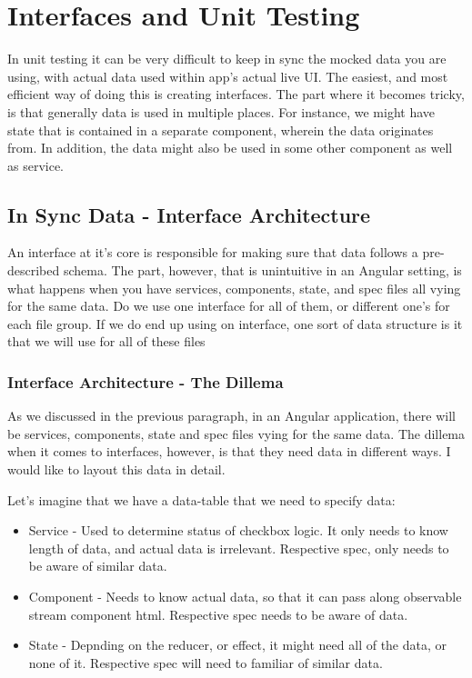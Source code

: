 \maketitle{}
\section{ Interfaces and Unit Testing }
In unit testing it can be very difficult to keep in sync the mocked data you
are using, with actual data used within app's actual live UI. The easiest, and
most efficient way of doing this is creating interfaces. The part where it
becomes tricky, is that generally data is used in multiple places. For instance,
we might have state that is contained in a separate component, wherein the data
originates from. In addition, the data might also be used in some other component
as well as service.

\subsection{ In Sync Data - Interface Architecture }
An interface at it's core is responsible for making sure that data follows a
pre-described schema. The part, however, that is unintuitive in an Angular
setting, is what happens when you have services, components, state, and spec
files all vying for the same data. Do we use one interface for all of them,
or different one's for each file group. If we do end up using on interface, one
sort of data structure is it that we will use for all of these files

\subsubsection{ Interface Architecture - The Dillema }
As we discussed in the previous paragraph, in an Angular application, there will
be services, components, state and spec files vying for the same data. The
dillema when it comes to interfaces, however, is that they need data in
different ways. I would like to layout this data in detail.

Let's imagine that we have a data-table that we need to specify data:
\begin{itemize}
  \item Service - Used to determine status of checkbox logic. It only needs to
  know length of data, and actual data is irrelevant. Respective spec, only
  needs to be aware of similar data.
  \item Component - Needs to know actual data, so that it can pass along
  observable stream component html. Respective spec needs to be aware of data.
  \item State - Depnding on the reducer, or effect, it might need all of the
  data, or none of it. Respective spec will need to familiar of similar data.
\end{itemize}


